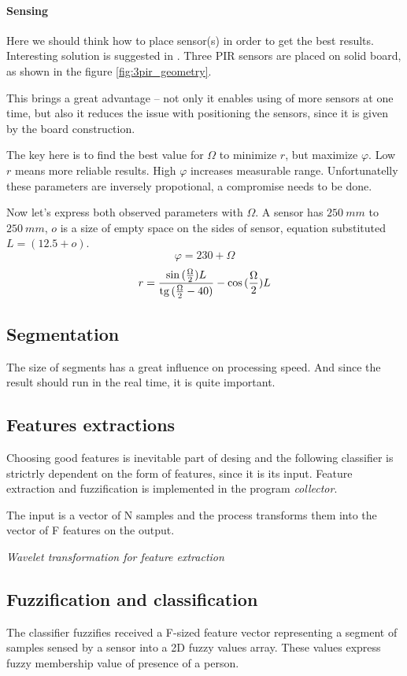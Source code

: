 \paragraph{Sensing}
Here we should think how to place sensor(s) in order to get the best results.
Interesting solution is suggested in \cite{GestureControl}. Three PIR sensors are
placed on solid board, as shown in the figure \ref{fig:3pir_geometry}.

This brings a great advantage -- not only it enables using of more sensors at one time, but
also it reduces the issue with positioning the sensors, since it is given by the
board construction.

The key here is to find the best value for $\Omega$ to minimize $r$, but maximize
$\varphi$. Low $r$ means more reliable results. High $\varphi$ increases measurable range.
Unfortunatelly these parameters are inversely propotional, a compromise needs to be done.

Now let's express both observed parameters with $\Omega$. A sensor has $250~mm$ to $250~mm$,
$o$ is a size of empty space on the sides of sensor, equation substituted $L = (12.5 + o)$.
$$\varphi = 230 + \Omega$$
$$r = \frac{\sin{(\frac{\Omega}{2})}L}{\tg{(\frac{\Omega}{2}-40)}} - \cos{(\frac{\Omega}{2})}L$$


\subsection*{Segmentation}
The size of segments has a great influence on processing speed. And since the
result should run in the real time, it is quite important.

\subsection*{Features extractions}
Choosing good features is inevitable part of desing and the following classifier
is strictrly dependent on the form of features, since it is its input. Feature extraction
and fuzzification is implemented in the program {\it collector}.

The input is a vector of N samples and the process transforms them into the vector of
F features on the output.

{\it Wavelet transformation for feature extraction}

\subsection*{Fuzzification and classification}
The classifier fuzzifies received a F-sized feature vector representing a segment of samples sensed by a sensor
into a 2D fuzzy values array. These values express fuzzy membership value of presence of a person.

